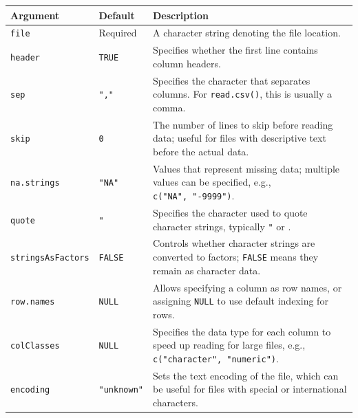 \documentclass[
  letterpaper,
  DIV=11,
  numbers=noendperiod]{scrreprt}
\newcounter{none} %
\begin{document}
{\def\LTcaptype{none} %
\begin{longtable}[]{@{}
  >{\raggedright\arraybackslash}p{}
  >{\raggedright\arraybackslash}p{}
  >{\raggedright\arraybackslash}p{}@{}}
\toprule\noalign{}
\begin{minipage}[b]{\linewidth}\raggedright
Argument
\end{minipage} & \begin{minipage}[b]{\linewidth}\raggedright
Default
\end{minipage} & \begin{minipage}[b]{\linewidth}\raggedright
Description
\end{minipage} \\
\midrule\noalign{}
\endhead
\bottomrule\noalign{}
\endlastfoot
\texttt{file} & Required & A character string denoting the file
location. \\
\texttt{header} & \texttt{TRUE} & Specifies whether the first line
contains column headers. \\
\texttt{sep} & \texttt{","} & Specifies the character that separates
columns. For \texttt{read.csv()}, this is usually a comma. \\
\texttt{skip} & \texttt{0} & The number of lines to skip before reading
data; useful for files with descriptive text before the actual data. \\
\texttt{na.strings} & \texttt{"NA"} & Values that represent missing
data; multiple values can be specified, e.g.,
\texttt{c("NA",\ "-9999")}. \\
\texttt{quote} & \texttt{"} & Specifies the character used to quote
character strings, typically \texttt{"} or
\texttt{\textquotesingle{}}. \\
\texttt{stringsAsFactors} & \texttt{FALSE} & Controls whether character
strings are converted to factors; \texttt{FALSE} means they remain as
character data. \\
\texttt{row.names} & \texttt{NULL} & Allows specifying a column as row
names, or assigning \texttt{NULL} to use default indexing for rows. \\
\texttt{colClasses} & \texttt{NULL} & Specifies the data type for each
column to speed up reading for large files, e.g.,
\texttt{c("character",\ "numeric")}. \\
\texttt{encoding} & \texttt{"unknown"} & Sets the text encoding of the
file, which can be useful for files with special or international
characters. \\
\end{longtable}
}
\end{document}
